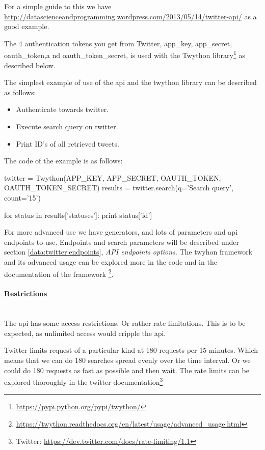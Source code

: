 For a simple guide to this we have
\url{http://datascienceandprogramming.wordpress.com/2013/05/14/twitter-api/} as
a good example.

The 4 authentication tokens you get from Twitter, app\_key, app\_secret, oauth\_token,a nd
oauth\_token\_secret, is used with the Twython
library\footnote{\url{https://pypi.python.org/pypi/twython/}} as described
below.

The simplest example of use of the api and the twython library can be described
as follows:
\begin{itemize}
	\item Authenticate towards twitter.
	\item Execute search query on twitter.
	\item Print ID's of all retrieved tweets.
\end{itemize} 

The code of the example is as follows:
\begin{python}
twitter = Twython(APP_KEY, APP_SECRET, OAUTH_TOKEN, OAUTH_TOKEN_SECRET)
results = twitter.search(q='Search query', count='15')

for status in results['statuses']:
    print status['id']
\end{python}

For more advanced use we have generators, and lots of parameters and api
endpoints to use. Endpoints and search parameters will be described under
section \ref{data:twitter:endpoints}, \textit{API endpoints options}. 
The twyhon framework and its advanced usage can be explored more in the code and
in the documentation of the framework
\footnote{\url{https://twython.readthedocs.org/en/latest/usage/advanced_usage.html}}.
%

\paragraph{Restrictions}
\hspace{0pt}\\
The api has some access restrictions. Or rather rate limitations. This is to be
expected, as unlimited access would cripple the api.

Twitter limits request of a particular kind at 180 requests per 15 minutes.
Which means that we can do 180 searches spread evenly over the time interval. Or
we could do 180 requests as fast as possible and then wait. The rate limits can
be explored thoroughly in the twitter documentation\footnote{Twitter:
\url{https://dev.twitter.com/docs/rate-limiting/1.1}}

